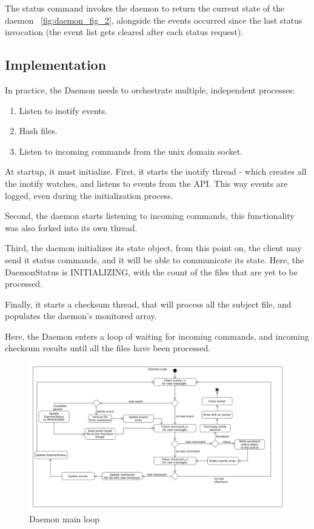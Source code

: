 The status command invokes the daemon to return the current state of the daemon ~\ref{fig:daemon_fig_2}, alongside the events occurred since the
last status invocation (the event list gets cleared after each status request).

\subsection{Implementation}
In practice, the Daemon needs to orchestrate  multiple, independent
processes:

\begin{enumerate}
    \item Listen to inotify events.
    \item Hash files.
    \item Listen to incoming commands from the unix domain socket.
\end{enumerate}

At startup, it must initialize.
First, it starts the inotify thread - which creates all the
inotify watches, and listens to events from the API\@.
This way events are logged, even during the initialization process.

Second, the daemon starts listening to incoming commands, this functionality was also
forked into its own thread.

Third, the daemon initializes its state object, from this point on,
the client may send it status commands, and it will be able to communicate its state.
Here, the DaemonStatus is INITIALIZING, with the count of the files that are yet to be
processed.

Finally, it starts a checksum thread, that will process all the subject file,
and populates the daemon's monitored array.

Here, the Daemon enters a loop of waiting for incoming commands, and incoming
checksum results until all the files have been processed.

\begin{figure}[H]
    \centering
    \includegraphics[width=12cm]{figures/daemon/daemon_loop}
    \caption{Daemon main loop}
    \label{fig:daemon_fig_3}
\end{figure}

